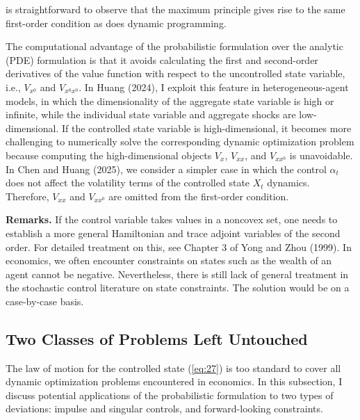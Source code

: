 \documentclass{article}
\begin{document}

\clearpage

is straightforward to observe that the maximum principle gives rise to the same first-order condition as does dynamic programming.

The computational advantage of the probabilistic formulation over the analytic (PDE) formulation is that it avoids calculating the first and second-order derivatives of the value function with respect to the uncontrolled state variable, i.e., $V_{x^{0}}$ and $V_{x^{0}x^{0}}$. In Huang (2024), I exploit this feature in heterogeneous-agent models, in which the dimensionality of the aggregate state variable is high or infinite, while the individual state variable and aggregate shocks are low-dimensional. If the controlled state variable is high-dimensional, it becomes more challenging to numerically solve the corresponding dynamic optimization problem because computing the high-dimensional objects $V_{x}$, $V_{xx}$, and $V_{xx^{0}}$ is unavoidable. In Chen and Huang (2025), we consider a simpler case in which the control $\alpha_{t}$ does not affect the volatility terms of the controlled state $X_{t}$ dynamics. Therefore, $V_{xx}$ and $V_{xx^{0}}$ are omitted from the first-order condition.

\textbf{Remarks.} If the control variable takes values in a noncovex set, one needs to establish a more general Hamiltonian and trace adjoint variables of the second order. For detailed treatment on this, see Chapter 3 of Yong and Zhou (1999). In economics, we often encounter constraints on states such as the wealth of an agent cannot be negative. Nevertheless, there is still lack of general treatment in the stochastic control literature on state constraints. The solution would be on a case-by-case basis.

\subsection{Two Classes of Problems Left Untouched}

The law of motion for the controlled state (\ref{eq:27}) is too standard to cover all dynamic optimization problems encountered in economics. In this subsection, I discuss potential applications of the probabilistic formulation to two types of deviations: impulse and singular controls, and forward-looking constraints.
\end{document}
